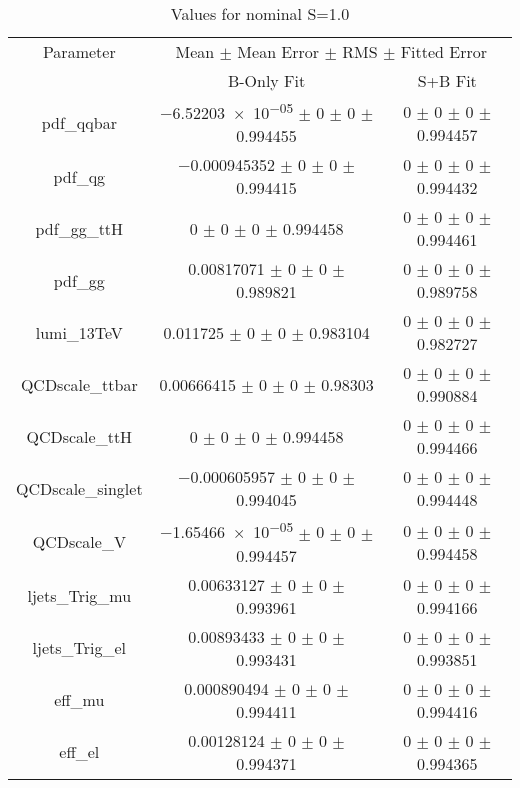 \begin{table}
\centering
\caption{Values for nominal S=1.0}
\begin{tabular}{ccc}
\toprule
Parameter 	& \multicolumn{2}{c}{Mean $\pm$ Mean Error $\pm$ RMS $\pm$ Fitted Error}\\
 	& B-Only Fit & S+B Fit\\
\midrule
pdf\_qqbar 	& \num{-6.52203e-05} $\pm$ \num{0} $\pm$ \num{0} $\pm$ \num{0.994455} 	& \num{0} $\pm$ \num{0} $\pm$ \num{0} $\pm$ \num{0.994457}\\
pdf\_qg 	& \num{-0.000945352} $\pm$ \num{0} $\pm$ \num{0} $\pm$ \num{0.994415} 	& \num{0} $\pm$ \num{0} $\pm$ \num{0} $\pm$ \num{0.994432}\\
pdf\_gg\_ttH 	& \num{0} $\pm$ \num{0} $\pm$ \num{0} $\pm$ \num{0.994458} 	& \num{0} $\pm$ \num{0} $\pm$ \num{0} $\pm$ \num{0.994461}\\
pdf\_gg 	& \num{0.00817071} $\pm$ \num{0} $\pm$ \num{0} $\pm$ \num{0.989821} 	& \num{0} $\pm$ \num{0} $\pm$ \num{0} $\pm$ \num{0.989758}\\
lumi\_13TeV 	& \num{0.011725} $\pm$ \num{0} $\pm$ \num{0} $\pm$ \num{0.983104} 	& \num{0} $\pm$ \num{0} $\pm$ \num{0} $\pm$ \num{0.982727}\\
QCDscale\_ttbar 	& \num{0.00666415} $\pm$ \num{0} $\pm$ \num{0} $\pm$ \num{0.98303} 	& \num{0} $\pm$ \num{0} $\pm$ \num{0} $\pm$ \num{0.990884}\\
QCDscale\_ttH 	& \num{0} $\pm$ \num{0} $\pm$ \num{0} $\pm$ \num{0.994458} 	& \num{0} $\pm$ \num{0} $\pm$ \num{0} $\pm$ \num{0.994466}\\
QCDscale\_singlet 	& \num{-0.000605957} $\pm$ \num{0} $\pm$ \num{0} $\pm$ \num{0.994045} 	& \num{0} $\pm$ \num{0} $\pm$ \num{0} $\pm$ \num{0.994448}\\
QCDscale\_V 	& \num{-1.65466e-05} $\pm$ \num{0} $\pm$ \num{0} $\pm$ \num{0.994457} 	& \num{0} $\pm$ \num{0} $\pm$ \num{0} $\pm$ \num{0.994458}\\
ljets\_Trig\_mu 	& \num{0.00633127} $\pm$ \num{0} $\pm$ \num{0} $\pm$ \num{0.993961} 	& \num{0} $\pm$ \num{0} $\pm$ \num{0} $\pm$ \num{0.994166}\\
ljets\_Trig\_el 	& \num{0.00893433} $\pm$ \num{0} $\pm$ \num{0} $\pm$ \num{0.993431} 	& \num{0} $\pm$ \num{0} $\pm$ \num{0} $\pm$ \num{0.993851}\\
eff\_mu 	& \num{0.000890494} $\pm$ \num{0} $\pm$ \num{0} $\pm$ \num{0.994411} 	& \num{0} $\pm$ \num{0} $\pm$ \num{0} $\pm$ \num{0.994416}\\
eff\_el 	& \num{0.00128124} $\pm$ \num{0} $\pm$ \num{0} $\pm$ \num{0.994371} 	& \num{0} $\pm$ \num{0} $\pm$ \num{0} $\pm$ \num{0.994365}\\

\end{tabular}
\end{table}
